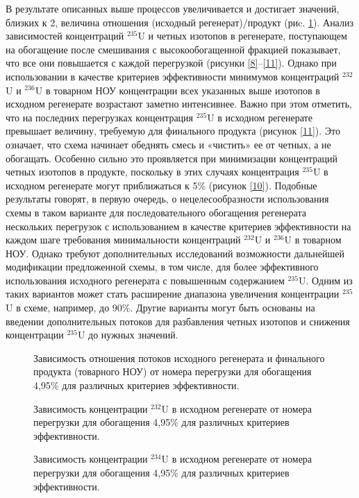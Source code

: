 В результате описанных выше процессов увеличивается и достигает значений, близких к 2, величина отношения (исходный регенерат)/продукт (риc. \ref{7}). Анализ зависимостей концентраций $^{235}$U и четных изотопов в регенерате, поступающем на обогащение после смешивания с высокообогащенной фракцией показывает, что все они повышается с каждой перегрузкой (рисунки \ref{8}–\ref{11}). Однако при использовании в качестве критериев эффективности минимумов концентраций  $^{232}$U и  $^{236}$U в товарном НОУ концентрации всех указанных выше изотопов в исходном регенерате возрастают заметно интенсивнее. Важно при этом отметить, что на последних перегрузках концентрация $^{235}$U в исходном регенерате превышает величину, требуемую для финального продукта (рисунок \ref{11}). Это означает, что схема начинает обеднять смесь и «чистить» ее от четных, а не обогащать. Особенно сильно это проявляется при минимизации концентраций четных изотопов в продукте, поскольку в этих случаях концентрация $^{235}$U в исходном регенерате могут приближаться к 5\% (рисунок \ref{10}). Подобные результаты говорят, в первую очередь, о нецелесообразности использования схемы в таком варианте для последовательного обогащения регенерата нескольких перегрузок с использованием в качестве критериев эффективности на каждом шаге требования минимальности концентраций $^{232}$U и  $^{236}$U в товарном НОУ. Однако требуют дополнительных исследований возможности дальнейшей модификации предложенной схемы, в том числе, для более эффективного использования исходного регенерата с повышенным содержанием $^{235}$U. Одним из таких вариантов может стать расширение диапазона увеличения концентрации  $^{235}$U в схеме, например, до 90\%. Другие варианты могут быть основаны на введении дополнительных потоков для разбавления четных изотопов и снижения концентрации  $^{235}$U до нужных значений.


\begin{figure}[ht]
    \centering
    
    \caption{Зависимость отношения потоков исходного регенерата и финального продукта (товарного НОУ) от номера перегрузки для обогащения 4,95\% для различных критериев эффективности.}\label{7}
\end{figure}



\begin{figure}[ht]
    \centering
    \begin{minipage}{.5\textwidth}
      \centering
      
      \caption{{Зависимость концентрации $^{232}$U в исходном регенерате от номера перегрузки для обогащения 4,95\% для различных критериев эффективности.{\label{8}}}}
    \end{minipage}%
    \begin{minipage}{.5\textwidth}
      \centering
      
\caption{{Зависимость концентрации $^{234}$U в исходном регенерате от номера перегрузки для обогащения 4,95\% для различных критериев эффективности.{\label{9}}}}
\end{minipage}
\end{figure}


